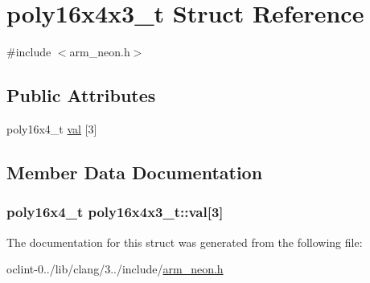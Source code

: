 \hypertarget{structpoly16x4x3__t}{\section{poly16x4x3\-\_\-t Struct Reference}
\label{structpoly16x4x3__t}
}


{\ttfamily \#include $<$arm\-\_\-neon.\-h$>$}

\subsection*{Public Attributes}
\begin{DoxyCompactItemize}
\item 
poly16x4\-\_\-t \hyperlink{structpoly16x4x3__t_aab74a391c79c5a34686fa8761b43126a}{val} \mbox{[}3\mbox{]}
\end{DoxyCompactItemize}


\subsection{Member Data Documentation}
\hypertarget{structpoly16x4x3__t_aab74a391c79c5a34686fa8761b43126a}{
\subsubsection[{val}]{\setlength{\rightskip}{0pt plus 5cm}poly16x4\-\_\-t poly16x4x3\-\_\-t\-::val\mbox{[}3\mbox{]}}}\label{structpoly16x4x3__t_aab74a391c79c5a34686fa8761b43126a}


The documentation for this struct was generated from the following file\-:\begin{DoxyCompactItemize}
\item 
oclint-\/0../lib/clang/3../include/\hyperlink{arm__neon_8h}{arm\-\_\-neon.\-h}\end{DoxyCompactItemize}
